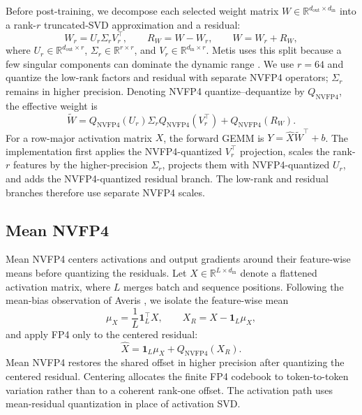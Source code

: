\documentclass[letterpaper]{article}
\begin{document}
Before post-training, we decompose each selected weight matrix $W\in\mathbb{R}^{d_{\mathrm{out}}\times d_{\mathrm{in}}}$ into a rank-$r$ truncated-SVD approximation and a residual:
\begin{equation}
    W_r = U_r\Sigma_r V_r^{\top},
    \qquad
    R_W = W-W_r,
    \qquad
    W=W_r+R_W,
    \label{eq:weight-svd}
\end{equation}
where $U_r\in\mathbb{R}^{d_{\mathrm{out}}\times r}$, $\Sigma_r\in\mathbb{R}^{r\times r}$, and $V_r\in\mathbb{R}^{d_{\mathrm{in}}\times r}$. Metis uses this split because a few singular components can dominate the dynamic range \citep{cao2025metis}. We use $r=64$ and quantize the low-rank factors and residual with separate NVFP4 operators; $\Sigma_r$ remains in higher precision. Denoting NVFP4 quantize--dequantize by $Q_{\mathrm{NVFP4}}$, the effective weight is
\begin{equation}
    \widetilde W
    = Q_{\mathrm{NVFP4}}(U_r)\Sigma_r
      Q_{\mathrm{NVFP4}}(V_r^{\top})
      + Q_{\mathrm{NVFP4}}(R_W).
    \label{eq:weight-reconstruct}
\end{equation}
For a row-major activation matrix $X$, the forward GEMM is $Y=\widehat X\widetilde W^{\top}+b$. The implementation first applies the NVFP4-quantized $V_r^{\top}$ projection, scales the rank-$r$ features by the higher-precision $\Sigma_r$, projects them with NVFP4-quantized $U_r$, and adds the NVFP4-quantized residual branch. The low-rank and residual branches therefore use separate NVFP4 scales.

\subsection{Mean NVFP4}

Mean NVFP4 centers activations and output gradients around their feature-wise means before quantizing the residuals. Let $X\in\mathbb{R}^{L\times d_{\mathrm{in}}}$ denote a flattened activation matrix, where $L$ merges batch and sequence positions. Following the mean-bias observation of Averis \citep{cao2026averis}, we isolate the feature-wise mean
\begin{equation}
    \mu_X = \frac{1}{L}\mathbf{1}_L^{\top}X,
    \qquad
    X_R = X-\mathbf{1}_L\mu_X,
    \label{eq:activation-split}
\end{equation}
and apply FP4 only to the centered residual:
\begin{equation}
    \widehat X
    = \mathbf{1}_L\mu_X+Q_{\mathrm{NVFP4}}(X_R).
    \label{eq:activation-qdq}
\end{equation}
Mean NVFP4 restores the shared offset in higher precision after quantizing the centered residual. Centering allocates the finite FP4 codebook to token-to-token variation rather than to a coherent rank-one offset. The activation path uses mean-residual quantization in place of activation SVD.
\end{document}

